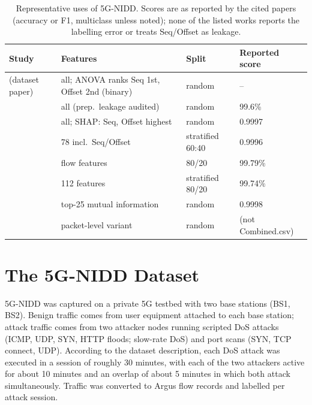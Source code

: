 \documentclass[preprint,12pt]{elsarticle}
\begin{document}
\begin{table}[t]
\centering
\caption{Representative uses of 5G-NIDD. Scores are as reported by the cited
papers (accuracy or F1, multiclass unless noted); none of the listed works
reports the labelling error or treats Seq/Offset as leakage.}
\label{tab:usage}
\small
\begin{tabular}{p{4.2cm} p{3.4cm} p{2.2cm} l}
\toprule
Study & Features & Split & Reported score\\
\midrule
\citet{samarakoon2022_5gnidd} (dataset paper) & all; ANOVA ranks Seq 1st, Offset 2nd (binary) & random & --\\
\citet{bouke2024_leakagefree} & all (prep.\ leakage audited) & random & 99.6\%\\
\citet{uccello2026_featureattr} & all; SHAP: Seq, Offset highest & random & 0.9997\\
\citet{ilias2024_cnnmoe} & 78 incl.\ Seq/Offset & stratified 60:40 & 0.9996\\
\citet{harshdeep2025_deeptransids} & flow features & 80/20 & 99.79\%\\
\citet{saranya2025_ibertroa} & 112 features & stratified 80/20 & 99.74\%\\
\citet{moubayed2024_eda_pipeline} & top-25 mutual information & random & 0.9998\\
\citet{lassoued2026_supervised_5gnidd} & packet-level variant & random & (not Combined.csv)\\
\bottomrule
\end{tabular}
\end{table}

\section{The 5G-NIDD Dataset}
\label{sec:dataset}

5G-NIDD \citep{samarakoon2022_5gnidd} was captured on a private 5G testbed with
two base stations (BS1, BS2). Benign traffic comes from user equipment attached
to each base station; attack traffic comes from two attacker nodes running
scripted DoS attacks (ICMP, UDP, SYN, HTTP floods; slow-rate DoS) and port
scans (SYN, TCP connect, UDP). According to the dataset description, each DoS
attack was executed in a session of roughly 30 minutes, with each of the two
attackers active for about 10 minutes and an overlap of about 5 minutes in
which both attack simultaneously. Traffic was converted to Argus flow records
and labelled per attack session.
\end{document}
